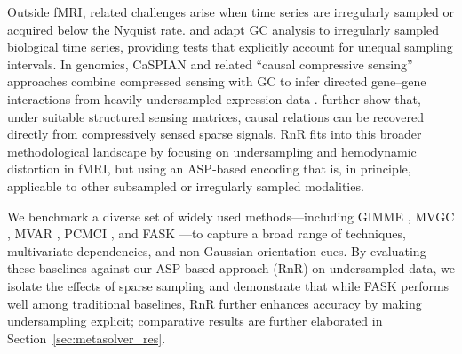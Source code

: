 Outside fMRI, related challenges arise when time series are irregularly sampled or acquired below the Nyquist rate. \citet{bahadori2012granger} and \citet{heerah2021granger}  adapt GC analysis to irregularly sampled biological time series, providing tests that explicitly account for unequal sampling intervals. In genomics, CaSPIAN and related “causal compressive sensing” approaches combine compressed sensing with GC to infer directed gene–gene interactions from heavily undersampled expression data \citep{deng2012causal}. \citet{kathpalia2023granger} further show that, under suitable structured sensing matrices, causal relations can be recovered directly from compressively sensed sparse signals. RnR fits into this broader methodological landscape by focusing on undersampling and hemodynamic distortion in fMRI, but using an ASP‑based encoding that is, in principle, applicable to other subsampled or irregularly sampled modalities.



We benchmark a diverse set of widely used methods—including GIMME \citep{GATES2012310}, MVGC \citep{barnett2009mvgc, barnett2014mvgc}, MVAR \citep{harrison2003multivariate}, PCMCI \citep{pcmci}, and FASK \citep{sanchez2019estimating}—to capture a broad range of techniques, multivariate dependencies, and non-Gaussian orientation cues. By evaluating these baselines against our ASP-based approach (RnR) on undersampled data, we isolate the effects of sparse sampling and demonstrate that while FASK performs well among traditional baselines, RnR further enhances accuracy by making undersampling explicit; comparative results are further elaborated in Section~\ref{sec:metasolver_res}.
\vspace{-0.3cm}
